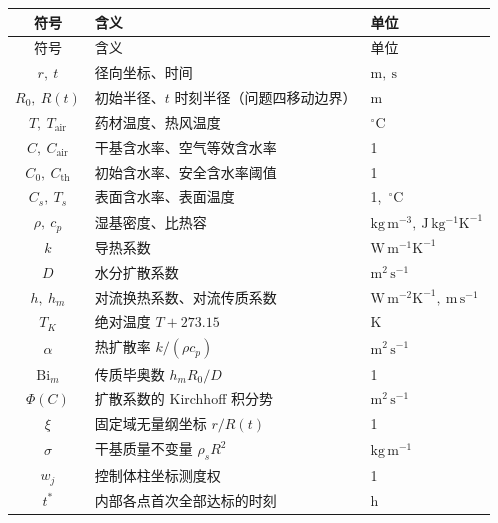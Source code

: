 \begin{center}
\small
\begin{longtable}{cll}
\toprule
符号 & 含义 & 单位 \\
\midrule
\endfirsthead
\toprule
符号 & 含义 & 单位 \\
\midrule
\endhead
\bottomrule
\endfoot
$r,\ t$ & 径向坐标、时间 & $\mathrm{m},\ \mathrm{s}$ \\
$R_0,\ R(t)$ & 初始半径、$t$ 时刻半径（问题四移动边界） & $\mathrm{m}$ \\
$T,\ T_{\mathrm{air}}$ & 药材温度、热风温度 & $^{\circ}\mathrm{C}$ \\
$C,\ C_{\mathrm{air}}$ & 干基含水率、空气等效含水率 & 1 \\
$C_0,\ C_{\mathrm{th}}$ & 初始含水率、安全含水率阈值 & 1 \\
$C_s,\ T_s$ & 表面含水率、表面温度 & 1,\ $^{\circ}\mathrm{C}$ \\
$\rho,\ c_p$ & 湿基密度、比热容 & $\mathrm{kg\,m^{-3}},\ \mathrm{J\,kg^{-1}K^{-1}}$ \\
$k$ & 导热系数 & $\mathrm{W\,m^{-1}K^{-1}}$ \\
$D$ & 水分扩散系数 & $\mathrm{m^2\,s^{-1}}$ \\
$h,\ h_m$ & 对流换热系数、对流传质系数 & $\mathrm{W\,m^{-2}K^{-1}},\ \mathrm{m\,s^{-1}}$ \\
$T_K$ & 绝对温度 $T+273.15$ & $\mathrm{K}$ \\
$\alpha$ & 热扩散率 $k/(\rho c_p)$ & $\mathrm{m^2\,s^{-1}}$ \\
$\mathrm{Bi}_m$ & 传质毕奥数 $h_m R_0/D$ & 1 \\
$\Phi(C)$ & 扩散系数的 Kirchhoff 积分势 & $\mathrm{m^2\,s^{-1}}$ \\
$\xi$ & 固定域无量纲坐标 $r/R(t)$ & 1 \\
$\sigma$ & 干基质量不变量 $\rho_s R^2$ & $\mathrm{kg\,m^{-1}}$ \\
$w_j$ & 控制体柱坐标测度权 & 1 \\
$t^{*}$ & 内部各点首次全部达标的时刻 & $\mathrm{h}$ \\
\end{longtable}
\end{center}
